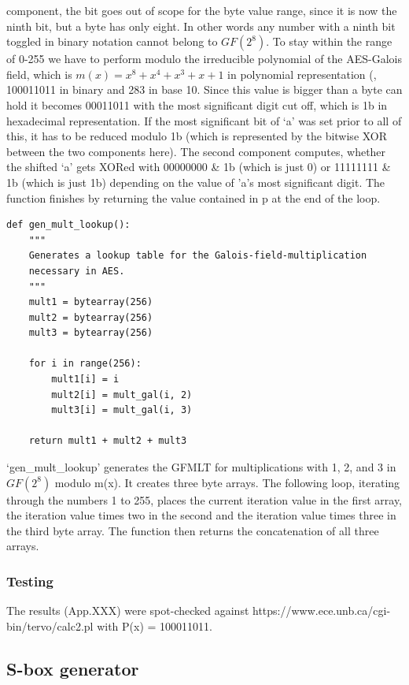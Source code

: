 component, the bit goes out of scope for the byte value range, since it
is now the ninth bit, but a byte has only eight. In other words any
number with a ninth bit toggled in binary notation cannot belong to
$GF(2^{8})$. To stay within the range of 0-255 we have to perform modulo the
irreducible polynomial of the AES-Galois field, which is $m(x) = x^8 + x^4 +
x^3 + x + 1$ in polynomial representation (\cite[ch. 3.4.1]{rijndael},
100011011 in binary and 283 in base 10. Since this value is bigger than
a byte can hold it becomes 00011011 with the most significant digit cut
off, which is 1b in hexadecimal representation. If the most significant
bit of `a' was set prior to all of this, it has to be reduced modulo 1b
(which is represented by the bitwise XOR between the two components
here). The second component computes, whether the shifted `a' gets XORed
with 00000000 \& 1b (which is just 0) or 11111111 \& 1b (which is just
1b) depending on the value of 'a's most significant digit. The function
finishes by returning the value contained in p at the end of the loop.

\begin{lstlisting}
def gen_mult_lookup():
    """
    Generates a lookup table for the Galois-field-multiplication
    necessary in AES.
    """
    mult1 = bytearray(256)
    mult2 = bytearray(256)
    mult3 = bytearray(256)

    for i in range(256):
        mult1[i] = i
        mult2[i] = mult_gal(i, 2)
        mult3[i] = mult_gal(i, 3)

    return mult1 + mult2 + mult3
\end{lstlisting}

`gen\_mult\_lookup' generates the GFMLT for multiplications with 1, 2,
and 3 in $GF(2^{8})$ modulo m(x). It creates three byte arrays. The following
loop, iterating through the numbers 1 to 255, places the current
iteration value in the first array, the iteration value times two in the
second and the iteration value times three in the third byte array. The
function then returns the concatenation of all three arrays.

\hypertarget{testing}{%
\subsubsection{Testing}\label{testing}}

The results (App.XXX) were spot-checked against
https://www.ece.unb.ca/cgi-bin/tervo/calc2.pl with P(x) = 100011011.

\hypertarget{s-box-generator}{%
\subsection{S-box generator}\label{s-box-generator}}

